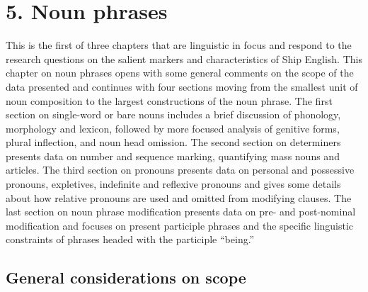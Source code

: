 \chapter{{5.} {Noun} {phrases}}

This is the first of three chapters that are linguistic in focus and respond to the research questions on the salient markers and characteristics of Ship English. This chapter on noun phrases opens with some general comments on the scope of the data presented and continues with four sections moving from the smallest unit of noun composition to the largest constructions of the noun phrase. The first section on single-word or bare nouns includes a brief discussion of phonology, morphology and lexicon, followed by more focused analysis of genitive forms, plural inflection, and noun head omission. The second section on determiners presents data on number and sequence marking, quantifying mass nouns and articles. The third section on pronouns presents data on personal and possessive pronouns, expletives, indefinite and reflexive pronouns and gives some details about how relative pronouns are used and omitted from modifying clauses. The last section on noun phrase modification presents data on pre- and post-nominal modification and focuses on present participle phrases and the specific linguistic constraints of phrases headed with the participle “being.” 

\section{{General} {considerations} {on} {scope}}%

